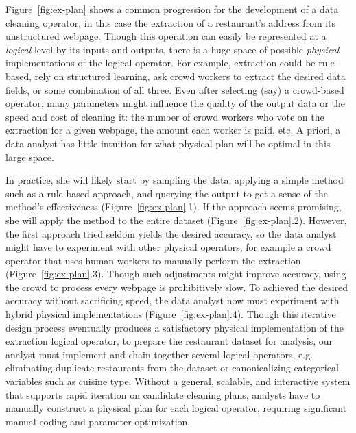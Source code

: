 Figure~\ref{fig:ex-plan} shows a common progression for the development of a data cleaning operator, in this case the extraction of a restaurant's address from its unstructured webpage.
Though this operation can easily be represented at a \textit{logical} level by its inputs and outputs, there is a huge space of possible \textit{physical} implementations of the logical operator. 
For example, extraction could be rule-based, rely on structured learning, ask crowd workers to extract the desired data fields, or some combination of all three.
Even after selecting (say) a crowd-based operator, many parameters might influence the quality of the output data or the speed and cost of cleaning it: the number of crowd workers who vote on the extraction for a given webpage, the amount each worker is paid, etc.
A priori, a data analyst has little intuition for what physical plan will be optimal in this large space.

In practice, she will likely start by sampling the data, applying a simple method such as a rule-based approach, and querying the output to get a sense of the method's effectiveness (Figure~\ref{fig:ex-plan}.1).
If the approach seems promising, she will apply the method to the entire dataset (Figure~\ref{fig:ex-plan}.2).
However, the first approach tried seldom yields the desired accuracy, so the data analyst might have to experiment with other physical operators, for example a crowd operator that uses human workers to manually perform the extraction (Figure~\ref{fig:ex-plan}.3).
Though such adjustments might improve accuracy, using the crowd to process every webpage is prohibitively slow.
To achieved the desired accuracy without sacrificing speed, the data analyst now must experiment with hybrid physical implementations (Figure~\ref{fig:ex-plan}.4).
Though this iterative design process eventually produces a satisfactory physical implementation of the extraction logical operator, to prepare the restaurant dataset for analysis, our analyst must implement and chain together several logical operators, e.g. eliminating duplicate restaurants from the dataset or canonicalizing categorical variables such as cuisine type.
Without a general, scalable, and interactive system that supports rapid iteration on candidate cleaning plans, analysts have to manually construct a physical plan for each logical operator, requiring significant manual coding and parameter optimization.




